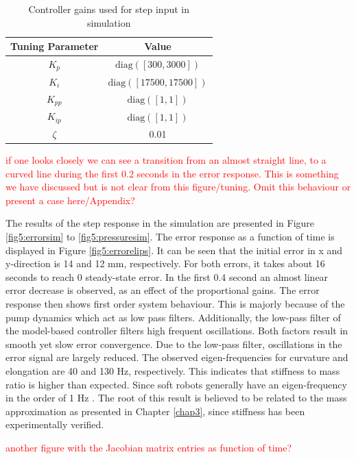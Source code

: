 \begin{table}[H]
    \centering
    \begin{tabular}{|c|c|} \hline
     \textbf{Tuning Parameter}    & \textbf{Value}  \\ \hline
    $K_p$ & $\text{diag}([300,3000])$  \\ \hline
    $K_i$ & $\text{diag}([17500,17500])$  \\ \hline
    $K_{pp}$ & $\text{diag}([1,1])$  \\ \hline
    $K_{ip}$ & $\text{diag}([1,1])$ \\ \hline
    $\zeta$ & 0.01 \\ \hline
    \end{tabular}
    \caption{Controller gains used for step input in simulation}
    \label{tab5:gainssim}
\end{table}

\textcolor{red}{if one looks closely we can see a transition from an almost straight line, to a curved line during the first 0.2 seconds in the error response. This is something we have discussed but is not clear from this figure/tuning. Omit this behaviour or present a case here/Appendix?}

The results of the step response in the simulation are presented in Figure \ref{fig5:errorsim} to \ref{fig5:pressuresim}. The error response as a function of time is displayed in Figure \ref{fig5:errorelips}. It can be seen that the initial error in x and y-direction is 14 and 12 mm, respectively. For both errors, it takes about 16 seconds to reach 0 steady-state error. In the first 0.4 second an almost linear error decrease is observed, as an effect of the proportional gains. The error response then shows first order system behaviour. This is majorly because of the pump dynamics which act as low pass filters. Additionally, the low-pass filter of the model-based controller filters high frequent oscillations. Both factors result in smooth yet slow error convergence. Due to the low-pass filter, oscillations in the error signal are largely reduced. The observed eigen-frequencies for curvature and elongation are 40 and 130 Hz, respectively. This indicates that stiffness to mass ratio is higher than expected. Since soft robots generally have an eigen-frequency in the order of 1 Hz \cite{tawk2018bioinspired}. The root of this result is believed to be related to the mass approximation as presented in Chapter \ref{chap3}, since stiffness has been experimentally verified. 

\textcolor{red}{another figure with the Jacobian matrix entries as function of time?}



